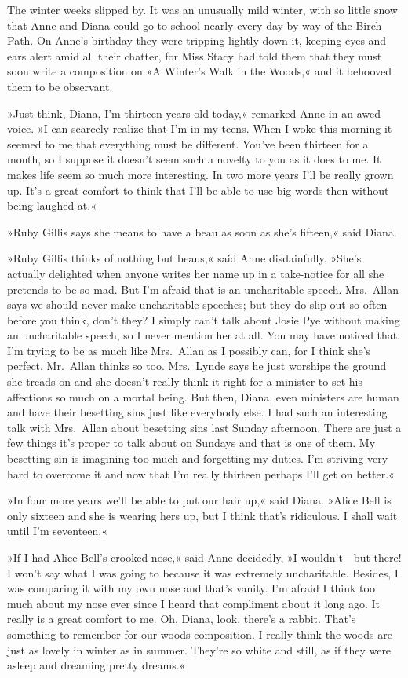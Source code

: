 The winter weeks slipped by. It was an unusually mild winter, with so little snow that Anne and Diana could go to school nearly every day by way of the Birch Path. On Anne's birthday they were tripping lightly down it, keeping eyes and ears alert amid all their chatter, for Miss Stacy had told them that they must soon write a composition on »A Winter's Walk in the Woods,« and it behooved them to be observant.

»Just think, Diana, I'm thirteen years old today,« remarked Anne in an awed voice. »I can scarcely realize that I'm in my teens. When I woke this morning it seemed to me that everything must be different. You've been thirteen for a month, so I suppose it doesn't seem such a novelty to you as it does to me. It makes life seem so much more interesting. In two more years I'll be really grown up. It's a great comfort to think that I'll be able to use big words then without being laughed at.«

»Ruby Gillis says she means to have a beau as soon as she's fifteen,« said Diana.

»Ruby Gillis thinks of nothing but beaus,« said Anne disdainfully. »She's actually delighted when anyone writes her name up in a take-notice for all she pretends to be so mad. But I'm afraid that is an uncharitable speech. Mrs.~Allan says we should never make uncharitable speeches; but they do slip out so often before you think, don't they? I simply can't talk about Josie Pye without making an uncharitable speech, so I never mention her at all. You may have noticed that. I'm trying to be as much like Mrs.~Allan as I possibly can, for I think she's perfect. Mr.~Allan thinks so too. Mrs.~Lynde says he just worships the ground she treads on and she doesn't really think it right for a minister to set his affections so much on a mortal being. But then, Diana, even ministers are human and have their besetting sins just like everybody else. I had such an interesting talk with Mrs.~Allan about besetting sins last Sunday afternoon. There are just a few things it's proper to talk about on Sundays and that is one of them. My besetting sin is imagining too much and forgetting my duties. I'm striving very hard to overcome it and now that I'm really thirteen perhaps I'll get on better.«

»In four more years we'll be able to put our hair up,« said Diana. »Alice Bell is only sixteen and she is wearing hers up, but I think that's ridiculous. I shall wait until I'm seventeen.«

»If I had Alice Bell's crooked nose,« said Anne decidedly, »I wouldn't—but there! I won't say what I was going to because it was extremely uncharitable. Besides, I was comparing it with my own nose and that's vanity. I'm afraid I think too much about my nose ever since I heard that compliment about it long ago. It really is a great comfort to me. Oh, Diana, look, there's a rabbit. That's something to remember for our woods composition. I really think the woods are just as lovely in winter as in summer. They're so white and still, as if they were asleep and dreaming pretty dreams.«

